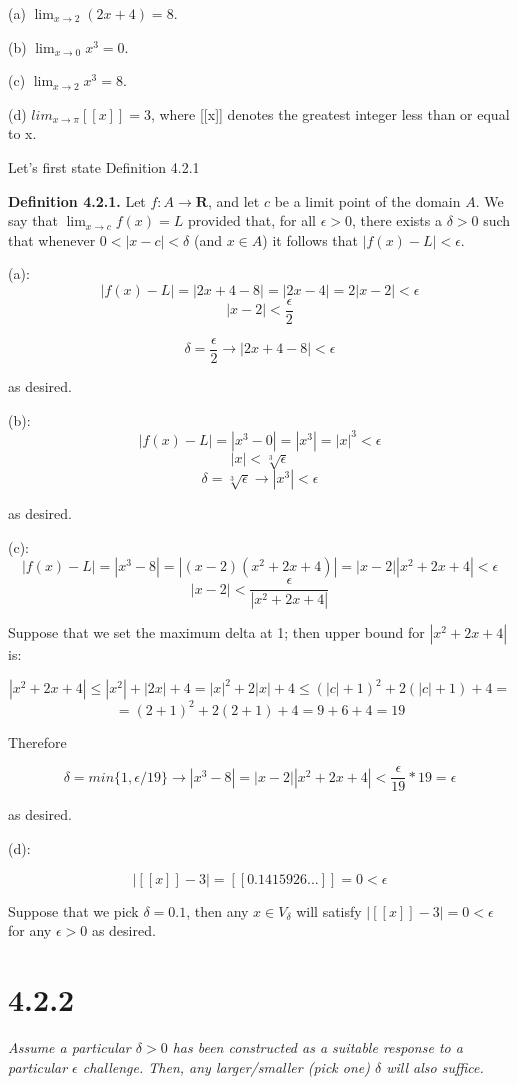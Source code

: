 \documentclass[11pt,oneside,titlepage]{book}
\begin{document}
(a) $\lim_{x \to 2}(2x + 4) = 8$.

(b) $\lim_{x\to0} x^3 = 0$.

(c) $\lim_{x\to2} x^3 = 8$.

(d) $lim_{x\to\pi}[[x]] = 3$, where [[x]] denotes the greatest integer less than or
equal to x.

Let's first state Definition 4.2.1

\textbf{Definition 4.2.1.} Let $f : A \to \textbf{R}$, and let $c$ be a limit point of the domain $A$. We say that $\lim_{x\to c} f(x) = L$ provided that, for all $\epsilon > 0$, there exists
a $\delta > 0$ such that whenever $0 < |x - c| < \delta$ (and $x \in A$) it follows that $|f(x) - L| < \epsilon$.

(a):
$$ |f(x) - L| = |2 x + 4 - 8| = |2 x - 4| = 2|x - 2| < \epsilon $$
$$ |x-2| < \frac{\epsilon}{2}$$

$$  \delta = \frac{\epsilon}{2} \to |2 x + 4 - 8| < \epsilon $$

as desired.

(b):
$$ |f(x) - L| = |x^3 - 0| = |x^3| = |x|^3 < \epsilon $$
$$ |x| < \sqrt[3]{\epsilon}{} $$
$$ \delta = \sqrt[3]{\epsilon} \to |x^3| < \epsilon $$

as desired.

(c):
$$ |f(x) - L| = |x^3 - 8| = |(x - 2)(x^2 + 2x + 4)| = |x-2||x^2 + 2x + 4| < \epsilon $$
$$|x-2| < \frac{\epsilon}{|x^2 + 2x + 4|} $$

Suppose that we set the maximum delta at 1; then upper bound for $|x^2 + 2x + 4|$ is:

$$ |x^2 + 2x + 4| \leq |x^2| + |2x| + 4 = |x|^2 + 2|x| + 4 \leq (|c| + 1)^2 + 2(|c| + 1) + 4 =$$
$$= (2 + 1)^2 + 2(2 + 1) + 4 = 9 + 6 + 4 = 19
$$

Therefore

$$\delta = min\{1, \epsilon/19\} \to |x^3 - 8| = |x-2||x^2 + 2x + 4| < \frac{\epsilon}{19} * 19 = \epsilon $$

as desired.

(d):

$$ |[[x]] - 3| = [[0.1415926...]] = 0 < \epsilon $$

Suppose that we pick $\delta = 0.1$, then any $x \in V_{\delta}$ will satisfy $|[[x]] - 3| = 0 < \epsilon $
for any $\epsilon > 0$ as desired.

\section*{4.2.2}
\textit{Assume a particular $\delta > 0$ has been constructed as a suitable response
  to a particular $\epsilon$ challenge. Then, any larger/smaller (pick one) $\delta$ will also suffice.}
\end{document}
